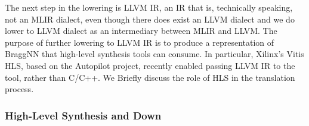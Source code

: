The next step in the lowering is LLVM IR, an IR that is, technically speaking, not an MLIR dialect, even though there does exist an LLVM dialect and we do lower to LLVM dialect as an intermediary between MLIR and LLVM.
The purpose of further lowering to LLVM IR is to produce a representation of BraggNN that high-level synthesis tools can consume.
In particular, Xilinx's Vitis HLS, based on the Autopilot project\cite{Zhang2008}, recently enabled passing LLVM IR to the tool, rather than C/C++.
We Briefly discuss the role of HLS in the translation process.

\subsubsection{High-Level Synthesis and Down}\label{subsec:hlsdown}

